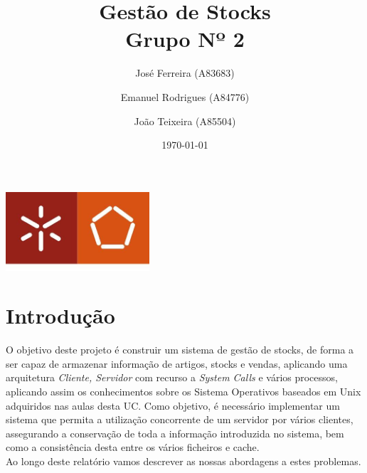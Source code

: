 \documentclass[a4paper]{report}
\begin{document}
\title{Gestão de Stocks\\ 
\large Grupo Nº 2}
\author{José Ferreira (A83683) \and Emanuel Rodrigues (A84776) \and João Teixeira (A85504)}
\date{\today}

\begin{center}
    \begin{minipage}{0.75\linewidth}
        \centering
        \includegraphics[width=0.4\textwidth]{eng.jpeg}\par\vspace{1cm}
        \vspace{1.5cm}
        \href{https://www.uminho.pt/PT}
        {\color{black}{\scshape\LARGE Universidade do Minho}} \par
        \vspace{1cm}
        \href{https://www.di.uminho.pt/}
        {\color{black}{\scshape\Large Departamento de Informática}} \par
        \vspace{1.5cm}
        \maketitle
    \end{minipage}
\end{center}

\tableofcontents

\pagebreak

\chapter{Introdução}

O objetivo deste projeto é construir um sistema de gestão de stocks,
de forma a ser capaz de armazenar informação de artigos, stocks e vendas,
aplicando uma arquitetura \textit{Cliente, Servidor} com recurso a \textit{System Calls}
e vários processos, aplicando assim os conhecimentos sobre os Sistema Operativos 
baseados em Unix adquiridos nas aulas desta UC\@.
Como objetivo, é necessário implementar um sistema que permita a utilização concorrente de 
um servidor por vários clientes, assegurando a conservação de toda a informação
introduzida no sistema, bem como a consistência desta entre os vários ficheiros
e cache.\\
Ao longo deste relatório vamos descrever as nossas abordagens a estes problemas.
\end{document}
